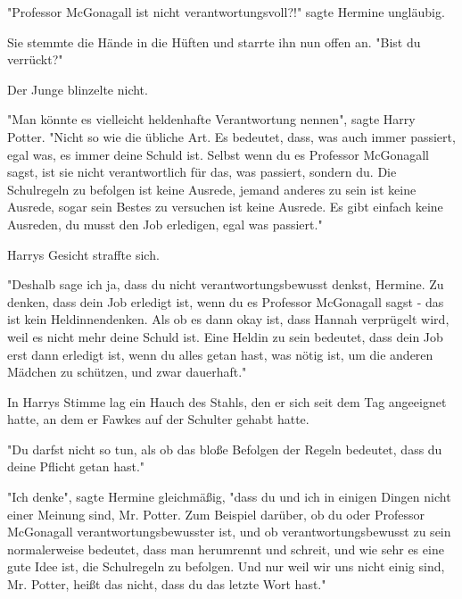 {"Professor McGonagall ist nicht verantwortungsvoll?!" sagte Hermine ungläubig.

Sie stemmte die Hände in die Hüften und starrte ihn nun offen an. "Bist du verrückt?"

Der Junge blinzelte nicht.

"Man könnte es vielleicht heldenhafte Verantwortung nennen", sagte Harry Potter. "Nicht so wie die übliche Art. Es bedeutet, dass, was auch immer passiert, egal was, es immer deine Schuld ist. Selbst wenn du es Professor McGonagall sagst, ist sie nicht verantwortlich für das, was passiert, sondern du. Die Schulregeln zu befolgen ist keine Ausrede, jemand anderes zu sein ist keine Ausrede, sogar sein Bestes zu versuchen ist keine Ausrede. Es gibt einfach keine Ausreden, du musst den Job erledigen, egal was passiert."

Harrys Gesicht straffte sich.

"Deshalb sage ich ja, dass du nicht verantwortungsbewusst denkst, Hermine. Zu denken, dass dein Job erledigt ist, wenn du es Professor McGonagall sagst - das ist kein Heldinnendenken. Als ob es dann okay ist, dass Hannah verprügelt wird, weil es nicht mehr deine Schuld ist. Eine Heldin zu sein bedeutet, dass dein Job erst dann erledigt ist, wenn du alles getan hast, was nötig ist, um die anderen Mädchen zu schützen, und zwar dauerhaft."

In Harrys Stimme lag ein Hauch des Stahls, den er sich seit dem Tag angeeignet hatte, an dem er Fawkes auf der Schulter gehabt hatte.

"Du darfst nicht so tun, als ob das bloße Befolgen der Regeln bedeutet, dass du deine Pflicht getan hast."

"Ich denke", sagte Hermine gleichmäßig, "dass du und ich in einigen Dingen nicht einer Meinung sind, Mr. Potter. Zum Beispiel darüber, ob du oder Professor McGonagall verantwortungsbewusster ist, und ob verantwortungsbewusst zu sein normalerweise bedeutet, dass man herumrennt und schreit, und wie sehr es eine gute Idee ist, die Schulregeln zu befolgen. Und nur weil wir uns nicht einig sind, Mr. Potter, heißt das nicht, dass du das letzte Wort hast."

}
